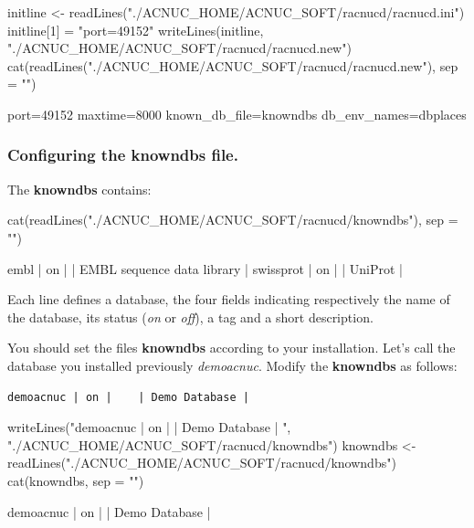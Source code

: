 \documentclass{article}
\begin{document}
\begin{Schunk}
\begin{Sinput}
 initline <- readLines("./ACNUC_HOME/ACNUC_SOFT/racnucd/racnucd.ini")
 initline[1] = "port=49152"
 writeLines(initline, "./ACNUC_HOME/ACNUC_SOFT/racnucd/racnucd.new")
 cat(readLines("./ACNUC_HOME/ACNUC_SOFT/racnucd/racnucd.new"), 
     sep = "\n")
\end{Sinput}
\begin{Soutput}
port=49152
maxtime=8000
known_db_file=knowndbs
db_env_names=dbplaces
\end{Soutput}
\end{Schunk}

 
\subsubsection{Configuring the knowndbs file.}

The \textbf{knowndbs} contains:

\begin{Schunk}
\begin{Sinput}
 cat(readLines("./ACNUC_HOME/ACNUC_SOFT/racnucd/knowndbs"), 
     sep = "\n")
\end{Sinput}
\begin{Soutput}
embl | on |    | EMBL sequence data library | 
swissprot   | on |  | UniProt |
\end{Soutput}
\end{Schunk}

Each line defines a database,  the four fields indicating respectively the name
 of the database, its status  (\textit{on} or \textit{off}), a tag and a short description.
 
You should set the files \textbf{knowndbs}  according to your installation.
Let's call the database you installed previously \textit{demoacnuc}.
Modify  the \textbf{knowndbs} as follows:
\begin{verbatim}
demoacnuc | on |    | Demo Database | 
\end{verbatim}

\begin{Schunk}
\begin{Sinput}
 writeLines("demoacnuc | on |    | Demo Database | ", "./ACNUC_HOME/ACNUC_SOFT/racnucd/knowndbs")
 knowndbs <- readLines("./ACNUC_HOME/ACNUC_SOFT/racnucd/knowndbs")
 cat(knowndbs, sep = "\n")
\end{Sinput}
\begin{Soutput}
demoacnuc | on |    | Demo Database | 
\end{Soutput}
\end{Schunk}
\end{document}

